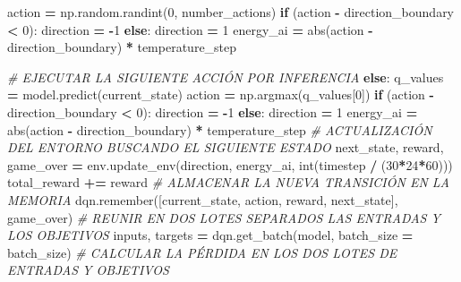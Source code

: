 \documentclass[
]{book}
\newenvironment{Shaded}{\begin{snugshade}}{\end{snugshade}}
\newcommand{\BuiltInTok}[1]{#1}
\newcommand{\CommentTok}[1]{\textcolor[rgb]{0.56,0.35,0.01}{\textit{#1}}}
\newcommand{\ControlFlowTok}[1]{\textcolor[rgb]{0.13,0.29,0.53}{\textbf{#1}}}
\newcommand{\DecValTok}[1]{\textcolor[rgb]{0.00,0.00,0.81}{#1}}
\newcommand{\NormalTok}[1]{#1}
\newcommand{\OperatorTok}[1]{\textcolor[rgb]{0.81,0.36,0.00}{\textbf{#1}}}
\begin{document}
\begin{Shaded}
\begin{Highlighting}[]
\NormalTok{                action }\OperatorTok{=}\NormalTok{ np.random.randint(}\DecValTok{0}\NormalTok{, number\_actions)}
                \ControlFlowTok{if}\NormalTok{ (action }\OperatorTok{{-}}\NormalTok{ direction\_boundary }\OperatorTok{\textless{}} \DecValTok{0}\NormalTok{):}
\NormalTok{                    direction }\OperatorTok{=} \OperatorTok{{-}}\DecValTok{1}
                \ControlFlowTok{else}\NormalTok{:}
\NormalTok{                    direction }\OperatorTok{=} \DecValTok{1}
\NormalTok{                energy\_ai }\OperatorTok{=} \BuiltInTok{abs}\NormalTok{(action }\OperatorTok{{-}}\NormalTok{ direction\_boundary) }\OperatorTok{*}\NormalTok{ temperature\_step}
            
            \CommentTok{\# EJECUTAR LA SIGUIENTE ACCIÓN POR INFERENCIA}
            \ControlFlowTok{else}\NormalTok{:}
\NormalTok{                q\_values }\OperatorTok{=}\NormalTok{ model.predict(current\_state)}
\NormalTok{                action }\OperatorTok{=}\NormalTok{ np.argmax(q\_values[}\DecValTok{0}\NormalTok{])}
                \ControlFlowTok{if}\NormalTok{ (action }\OperatorTok{{-}}\NormalTok{ direction\_boundary }\OperatorTok{\textless{}} \DecValTok{0}\NormalTok{):}
\NormalTok{                    direction }\OperatorTok{=} \OperatorTok{{-}}\DecValTok{1}
                \ControlFlowTok{else}\NormalTok{:}
\NormalTok{                    direction }\OperatorTok{=} \DecValTok{1}
\NormalTok{                energy\_ai }\OperatorTok{=} \BuiltInTok{abs}\NormalTok{(action }\OperatorTok{{-}}\NormalTok{ direction\_boundary) }\OperatorTok{*}\NormalTok{ temperature\_step}
            \CommentTok{\# ACTUALIZACIÓN DEL ENTORNO BUSCANDO EL SIGUIENTE ESTADO}
\NormalTok{            next\_state, reward, game\_over }\OperatorTok{=}\NormalTok{ env.update\_env(direction,}
\NormalTok{                                                           energy\_ai,}
                                                           \BuiltInTok{int}\NormalTok{(timestep }\OperatorTok{/}\NormalTok{ (}\DecValTok{30}\OperatorTok{*}\DecValTok{24}\OperatorTok{*}\DecValTok{60}\NormalTok{)))}
\NormalTok{            total\_reward }\OperatorTok{+=}\NormalTok{ reward}
            \CommentTok{\# ALMACENAR LA NUEVA TRANSICIÓN EN LA MEMORIA}
\NormalTok{            dqn.remember([current\_state, action, reward, next\_state], game\_over)}
            \CommentTok{\# REUNIR EN DOS LOTES SEPARADOS LAS ENTRADAS Y LOS OBJETIVOS}
\NormalTok{            inputs, targets }\OperatorTok{=}\NormalTok{ dqn.get\_batch(model, batch\_size }\OperatorTok{=}\NormalTok{ batch\_size)}
            \CommentTok{\# CALCULAR LA PÉRDIDA EN LOS DOS LOTES DE ENTRADAS Y OBJETIVOS}

\end{Highlighting}
\end{Shaded}
\end{document}
